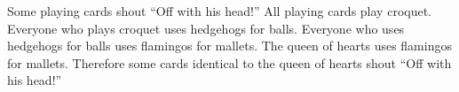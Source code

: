 \begin{exercises}




\item Some playing cards shout ``Off with his head!'' All playing cards play croquet. Everyone who plays croquet uses hedgehogs for balls. Everyone who uses hedgehogs for balls uses flamingos for mallets. The queen of hearts uses flamingos for mallets. Therefore some cards identical to the queen of hearts shout ``Off with his head!''





\end{exercises}
